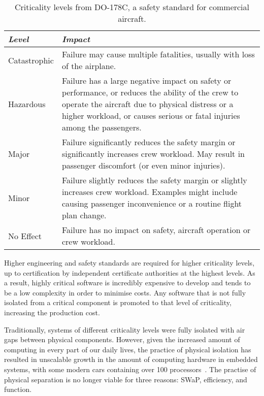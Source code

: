 \begin{table}
     \centering
     \begin{tabular}{ l p{10cm}} \toprule
         \emph{Level}   & \emph{Impact} \\ \midrule
         Catastrophic   & Failure may cause multiple fatalities, usually with loss of the airplane. \\
         Hazardous      & Failure has a large negative impact on safety or performance, or reduces the
                          ability of the crew to operate the aircraft due to physical distress or 
                          a higher workload, or causes serious or fatal injuries among the passengers.\\
         Major          & Failure significantly reduces the safety margin or significantly increases
                          crew workload. May result in passenger discomfort (or even minor
                          injuries).\\
         Minor          & Failure slightly reduces the safety margin or slightly increases crew
                          workload. Examples might include causing passenger inconvenience or a
                          routine flight plan change. \\
         No Effect      & Failure has no impact on safety, aircraft operation or crew workload. \\
         \bottomrule
     \end{tabular}
     \caption{Criticality levels from DO-178C, a safety standard for commercial aircraft.}
     \label{tab:criticality_table}
 \end{table}

Higher engineering and safety standards are required for higher criticality levels, up to
certification by independent certificate authorities at the highest levels. As a result, highly
critical software is incredibly expensive to develop and tends to be a low complexity in order to
minimise costs. Any software that is not fully isolated from a critical component is promoted to
that level of criticality, increasing the production cost.

Traditionally, systems of different criticality levels were fully isolated with
air gaps between physical components. However, given the increased amount of
computing in every part of our daily lives, the practice of physical isolation
has resulted in unscalable growth in the amount of computing hardware in
embedded systems, with some modern cars containing over 100
processors~\citep{Hergenhan_Heiser_08}. The practise of physical separation is no 
longer viable for three reasons: \gls{SWaP}, efficiency, and function.

